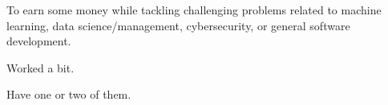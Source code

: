 \documentclass[12pt]{resume}
\begin{document}

    \begin{fullwidth}
    \makeheader
    \end{fullwidth}
    
    \sffamily

    To earn some money while tackling challenging problems related to machine learning, data science/management, 
    cybersecurity, or general software development.

    Worked a bit.
    

    Have one or two of them.
\end{document}
